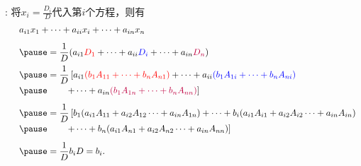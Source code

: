 \begin{frame}
  \begin{footnotesize}
    \proofname
    : 
    将$x_i=\frac{D_i}D$代入第$i$个方程，则有
    $$
    \begin{array}{cl}
      & a_{i1}x_1 +\cd + a_{ii}x_i + \cd + a_{in}x_n \\[0.3cm]
      & \pause=  \disp \frac1D(a_{i1}\red{D_1} +\cd + a_{ii}\blue{D_i} + \cd + a_{in}\purple{D_n}) \\[0.3cm]
      & \pause=  \disp \frac1D \left[
        a_{i1}\red{(b_1 A_{11}+ \cd + b_nA_{n1})}
        +\cd+ a_{ii}\blue{(b_1 A_{1i} + \cd + b_nA_{ni})}  \right. \\[0.2cm]
     & \pause \left. \ \ \ \ \ \
        + \cd + a_{in}\purple{(b_1 A_{1n}+ \cd + b_nA_{nn})} \right]\\[0.3cm]
     &\pause =  \disp \frac1D \left[
        b_1(a_{i1} A_{11}+ a_{i2} A_{12}  \cd + a_{in}A_{1n}) 
        +\cd + b_i(a_{i1} A_{i1}+ a_{i2} A_{i2}  \cd + a_{in}A_{in})   \right. \\[0.2cm]
        & \pause \left. \ \ \ \ \ \ + \cd+ b_n(a_{i1} A_{n1}+ a_{i2} A_{n2}  \cd + a_{in}A_{nn}) \right] \\[0.3cm]
      &\pause =  \disp \frac 1D b_{i} D = b_i.
    \end{array}
    $$
  \end{footnotesize}
\end{frame}

